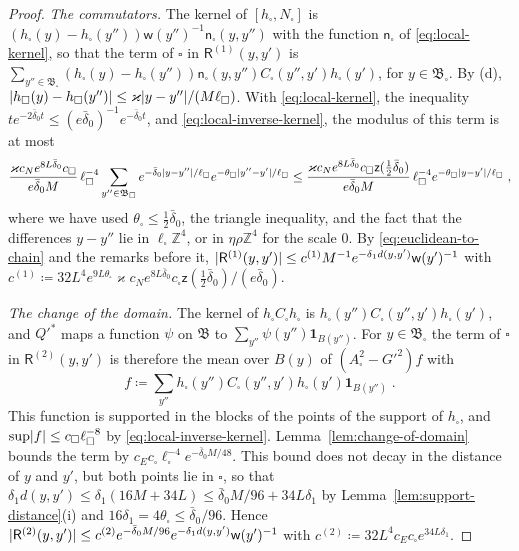 \documentclass[11pt]{preprint}
\DeclarePairedDelimiter{\abs}{\lvert}{\rvert}
\numberwithin{equation}{section}
\theoremstyle{definition}
\theoremstyle{remark}
\theoremstyle{plain}
\begin{document}
\begin{proof}
\emph{The commutators.} The kernel of $[h_\square, N_\square]$ is $(h_\square(y) - h_\square(y''))\mathsf w(y'')^{-1}\mathsf n_\square(y, y'')$ with the function $\mathsf n_\square$ of \eqref{eq:local-kernel}, so that the term of $\square$ in $\mathsf R^{(1)}(y, y')$ is $\sum_{y'' \in \mathfrak B_\square}(h_\square(y) - h_\square(y''))\mathsf n_\square(y, y'')C_\square(y'', y')h_\square(y')$, for $y \in \mathfrak B_\square$. By (d), $\abs{h_\square(y) - h_\square(y'')} \leq \varkappa\abs{y - y''}/(M\ell_\square)$. With \eqref{eq:local-kernel}, the inequality $te^{-2\bar\delta_0t} \leq (e\bar\delta_0)^{-1}e^{-\bar\delta_0t}$, and \eqref{eq:local-inverse-kernel}, the modulus of this term is at most
\begin{equation}\label{eq:commutator-term}
    \frac{\varkappa c_Ne^{8L\bar\delta_0}c_\square}{e\bar\delta_0M}\,\ell_\square^{-4}\sum_{y'' \in \mathfrak B_\square}e^{-\bar\delta_0\abs{y - y''}/\ell_\square}e^{-\theta_\square\abs{y'' - y'}/\ell_\square} \leq \frac{\varkappa c_Ne^{8L\bar\delta_0}c_\square\mathsf z(\frac12\bar\delta_0)}{e\bar\delta_0M}\,\ell_\square^{-4}e^{-\theta_\square\abs{y - y'}/\ell_\square}\;,
\end{equation}
where we have used $\theta_\square \leq \frac12\bar\delta_0$, the triangle inequality, and the fact that the differences $y - y''$ lie in $\ell_\square\mathbb Z^4$, or in $\eta\rho\mathbb Z^4$ for the scale $0$. By \eqref{eq:euclidean-to-chain} and the remarks before it, $\abs{\mathsf R^{(1)}(y, y')} \leq c^{(1)}M^{-1}e^{-\delta_1d(y, y')}\mathsf w(y')^{-1}$ with $c^{(1)} \coloneqq 32L^4e^{9L\theta_\square}\varkappa c_Ne^{8L\bar\delta_0}c_\square\mathsf z(\frac12\bar\delta_0)/(e\bar\delta_0)$.

\emph{The change of the domain.} The kernel of $h_\square C_\square h_\square$ is $h_\square(y'')C_\square(y'', y')h_\square(y')$, and $Q'^*$ maps a function $\psi$ on $\mathfrak B$ to $\sum_{y''}\psi(y'')\mathbf 1_{B(y'')}$. For $y \in \mathfrak B_\square$ the term of $\square$ in $\mathsf R^{(2)}(y, y')$ is therefore the mean over $B(y)$ of $(A_\square^2 - G'^2)f$ with
\begin{equation}\label{eq:change-source}
    f \coloneqq \sum_{y''}h_\square(y'')C_\square(y'', y')h_\square(y')\mathbf 1_{B(y'')}\;.
\end{equation}
This function is supported in the blocks of the points of the support of $h_\square$, and $\sup\abs f \leq c_\square\ell_\square^{-8}$ by \eqref{eq:local-inverse-kernel}. Lemma~\ref{lem:change-of-domain} bounds the term by $c_Ec_\square\ell_\square^{-4}e^{-\bar\delta_0M/48}$. This bound does not decay in the distance of $y$ and $y'$, but both points lie in $\square$, so that $\delta_1d(y, y') \leq \delta_1(16M + 34L) \leq \bar\delta_0M/96 + 34L\delta_1$ by Lemma~\ref{lem:support-distance}(i) and $16\delta_1 = 4\theta_\square \leq \bar\delta_0/96$. Hence $\abs{\mathsf R^{(2)}(y, y')} \leq c^{(2)}e^{-\bar\delta_0M/96}e^{-\delta_1d(y, y')}\mathsf w(y')^{-1}$ with $c^{(2)} \coloneqq 32L^4c_Ec_\square e^{34L\delta_1}$.


\end{proof}
\end{document}
